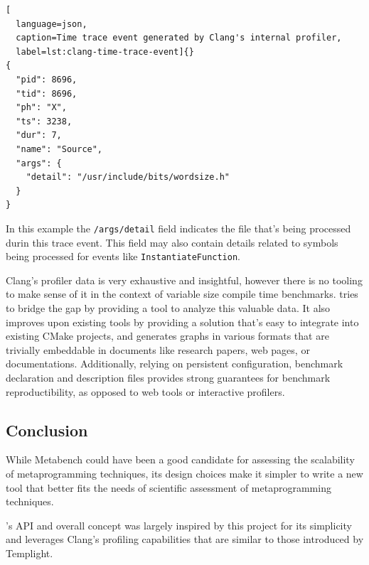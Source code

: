\documentclass[../main]{subfiles}
\begin{document}
\begin{lstlisting}[
  language=json,
  caption=Time trace event generated by Clang's internal profiler,
  label=lst:clang-time-trace-event]{}
{
  "pid": 8696,
  "tid": 8696,
  "ph": "X",
  "ts": 3238,
  "dur": 7,
  "name": "Source",
  "args": {
    "detail": "/usr/include/bits/wordsize.h"
  }
}
\end{lstlisting}

In this example the \lstinline{/args/detail} field indicates the file that's
being processed durin this trace event. This field may also contain details
related to symbols being processed for events like
\lstinline{InstantiateFunction}.

Clang's profiler data is very exhaustive and insightful, however there is no
tooling to make sense of it in the context of variable size compile time
benchmarks. \ctbench tries to bridge the gap by providing a tool to analyze
this valuable data. It also improves upon existing tools by providing a solution
that's easy to integrate into existing CMake projects, and generates graphs in
various formats that are trivially embeddable in documents like research papers,
web pages, or documentations. Additionally, relying on persistent configuration,
benchmark declaration and description files provides strong guarantees for
benchmark reproductibility, as opposed to web tools or interactive profilers.

\subsection{
  Conclusion
}

While Metabench could have been a good candidate for assessing the scalability
of metaprogramming techniques, its design choices make it simpler to write a new
tool that better fits the needs of scientific assessment of metaprogramming
techniques.

\ctbench's API and overall concept was largely inspired by this project for its
simplicity and leverages Clang's profiling capabilities that are similar to
those introduced by Templight.
\end{document}
